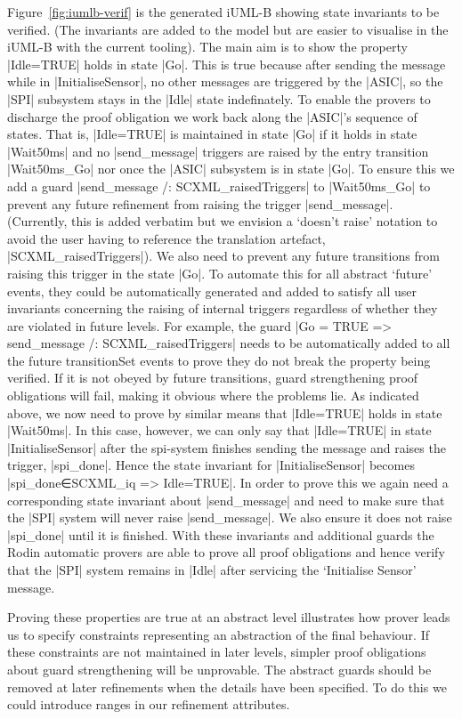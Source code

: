 Figure~\ref{fig:iumlb-verif} is the generated iUML-B showing state invariants to be verified. (The invariants are added to the \SCXML model but are easier to visualise in the iUML-B with the current tooling).
The main aim is to show the property |Idle=TRUE| holds in state |Go|. 
This is true because after sending the message while in |InitialiseSensor|, no other messages are triggered by the |ASIC|, so the |SPI| subsystem stays in the |Idle| state indefinately. 
To enable the provers to discharge the proof obligation we work back along the |ASIC|'s sequence of states. 
That is, |Idle=TRUE| is maintained in state |Go| if it holds in state |Wait50ms| and no |send_message| triggers are raised by the entry transition |Wait50ms_Go| nor once the |ASIC| subsystem is in state |Go|. 
To ensure this we add a guard |send_message /: SCXML_raisedTriggers| to |Wait50ms_Go| to prevent any future refinement from raising the trigger |send_message|.
(Currently, this is added verbatim but we envision a `doesn't raise' notation to avoid the user having to reference the translation artefact, |SCXML_raisedTriggers|).
We also need to prevent any future transitions from raising this trigger in the state |Go|.
To automate this for all abstract `future' events, they could be automatically generated and added to satisfy all user invariants concerning the raising of internal triggers regardless of whether they are violated in future levels. 
For example, the guard  |Go = TRUE => send_message /: SCXML_raisedTriggers| needs to be automatically added to all the future transitionSet events to prove they do not break the property being verified. 
If it is not obeyed by future transitions, guard strengthening proof obligations will fail, making it obvious where the problems lie.
As indicated above, we now need to prove by similar means that |Idle=TRUE| holds in state |Wait50ms|. 
In this case, however, we can only say that |Idle=TRUE| in state |InitialiseSensor| after the spi-system finishes sending the message and raises the trigger, |spi_done|. 
Hence the state invariant for |InitialiseSensor| becomes |spi_done∈SCXML_iq => Idle=TRUE|. 
In order to prove this we again need a corresponding state invariant about |send_message| and need to make sure that the |SPI| system will never raise |send_message|.
We also ensure it does not raise |spi_done| until it is finished. 
With these invariants and additional guards the Rodin automatic provers are able to prove all proof obligations and hence verify that the |SPI| system remains in |Idle| after servicing the `Initialise Sensor' message.

Proving these properties are true at an abstract level illustrates how prover leads us to specify constraints representing an abstraction of the final behaviour. If these constraints are not maintained in later levels, simpler proof obligations about guard strengthening will be unprovable. The abstract guards should be removed at later refinements when the details have been specified. To do this we could introduce ranges in our refinement attributes.

